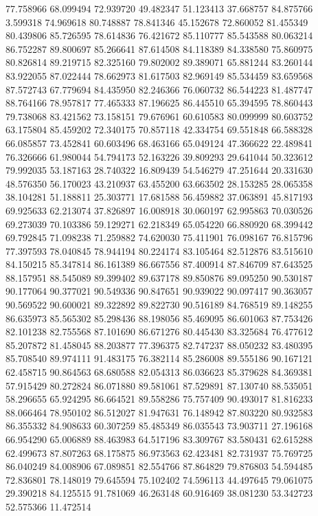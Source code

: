 77.758966
68.099494
72.939720
49.482347
51.123413
37.668757
84.875766
3.599318
74.969618
80.748887
78.841346
45.152678
72.860052
81.455349
80.439806
85.726595
78.614836
76.421672
85.110777
85.543588
80.063214
86.752287
89.800697
85.266641
87.614508
84.118389
84.338580
75.860975
80.826814
89.219715
82.325160
79.802002
89.389071
65.881244
83.260144
83.922055
87.022444
78.662973
81.617503
82.969149
85.534459
83.659568
87.572743
67.779694
84.435950
82.246366
76.060732
86.544223
81.487747
88.764166
78.957817
77.465333
87.196625
86.445510
65.394595
78.860443
79.738068
83.421562
73.158151
79.676961
60.610583
80.099999
80.603752
63.175804
85.459202
72.340175
70.857118
42.334754
69.551848
66.588328
66.085857
73.452841
60.603496
68.463166
65.049124
47.366622
22.489841
76.326666
61.980044
54.794173
52.163226
39.809293
29.641044
50.323612
79.992035
53.187163
28.740322
16.809439
54.546279
47.251644
20.331630
48.576350
56.170023
43.210937
63.455200
63.663502
28.153285
28.065358
38.104281
51.188811
25.303771
17.681588
56.459882
37.063891
45.817193
69.925633
62.213074
37.826897
16.008918
30.060197
62.995863
70.030526
69.273039
70.103386
59.129271
62.218349
65.054220
66.880920
68.399442
69.792845
71.098238
71.259882
74.620030
75.411901
76.098167
76.815796
77.397593
78.040845
78.944194
80.224174
83.105464
82.512876
83.515610
84.150215
85.347814
86.161389
86.667556
87.400914
87.846709
87.643525
88.157951
88.545089
89.399402
89.637178
89.850876
89.095250
90.530187
90.177064
90.377021
90.549336
90.847651
90.939022
90.097417
90.363057
90.569522
90.600021
89.322892
89.822730
90.516189
84.768519
89.148255
86.635973
85.565302
85.298436
88.198056
85.469095
86.601063
87.753426
82.101238
82.755568
87.101690
86.671276
80.445430
83.325684
76.477612
85.207872
81.458045
88.203877
77.396375
82.747237
88.050232
83.480395
85.708540
89.974111
91.483175
76.382114
85.286008
89.555186
90.167121
62.458715
90.864563
68.680588
82.054313
86.036623
85.379628
84.369381
57.915429
80.272824
86.071880
89.581061
87.529891
87.130740
88.535051
58.296655
65.924295
86.664521
89.558286
75.757409
90.493017
81.816233
88.066464
78.950102
86.512027
81.947631
76.148942
87.803220
80.932583
86.355332
84.908633
60.307259
85.485349
86.035543
73.903711
27.196168
66.954290
65.006889
88.463983
64.517196
83.309767
83.580431
62.615288
62.499673
87.807263
68.175875
86.973563
62.423481
82.731937
75.769725
86.040249
84.008906
67.089851
82.554766
87.864829
79.876803
54.594485
72.836801
78.148019
79.645594
75.102402
74.596113
44.497645
79.061075
29.390218
84.125515
91.781069
46.263148
60.916469
38.081230
53.342723
52.575366
11.472514
